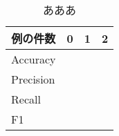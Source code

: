 \begin{table}[H]
\centering
\caption{あああ}
\begin{tabular}{|l||l|l|l|}
\hline
\multicolumn{1}{|c||}{例の件数} & \multicolumn{1}{c|}{0} & \multicolumn{1}{c|}{1} & \multicolumn{1}{c|}{2} \\ \hline
Accuracy    & & &\\ \hline
Precision   & & &\\ \hline
Recall      & & &\\ \hline
F1          & & &\\ \hline
\end{tabular}
\label{template}
\end{table}